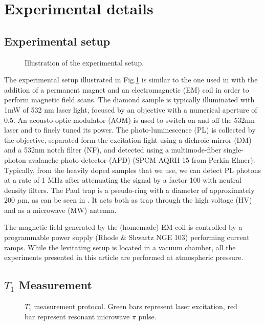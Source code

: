 \documentclass[preprintnumbers,amsmath,amssymb,onecolumn,12pt]{revtex4}
\begin{document}
\section{Experimental details}

\subsection{Experimental setup}

\begin{figure}[!ht]
  \centering {}
  \caption{Illustration of the experimental setup.}
	\label{Optics}
\end{figure}

The experimental setup illustrated in Fig.\ref{Optics} is similar to the one used in \citep{DelordPRL} with the addition of a permanent magnet and an electromagnetic (EM) coil in order to perform magnetic field scans. The diamond sample is typically illuminated with 1mW of 532 nm laser light, focused by an objective with a numerical aperture of 0.5. An acousto-optic modulator (AOM) is used to switch on and off the 532nm laser and to finely tuned its power. The photo-luminescence (PL) is collected by the objective, separated form the excitation light using a dichroic mirror (DM) and a 532nm notch filter (NF), and detected using a multimode-fiber single-photon avalanche photo-detector (APD) (SPCM-AQRH-15 from Perkin Elmer). Typically, from the heavily doped samples that we use, we can detect PL photons at a rate of 1 MHz after attenuating the signal by a factor 100 with neutral density filters. 
The Paul trap is a pseudo-ring with a diameter of approximately 200 $\mu$m, as can be seen in \citep{DelordPhD}. It acts both as trap through the high voltage (HV) and as a microwave (MW) antenna.

The magnetic field generated by the (homemade) EM coil is controlled by a programmable power supply (Rhode \& Shwartz NGE 103) performing current ramps.
While the levitating setup is located in a vacuum chamber, all the experiments presented in this article are performed at atmospheric pressure.

\subsection{$T_1$ Measurement}
\begin{figure}[!ht]
  \centering {}
  \caption{$T_1$ measurement protocol. Green bars represent laser excitation, red bar represent resonant microwave $\pi$ pulse.}
	\label{T1_protocol}
\end{figure}
\end{document}

